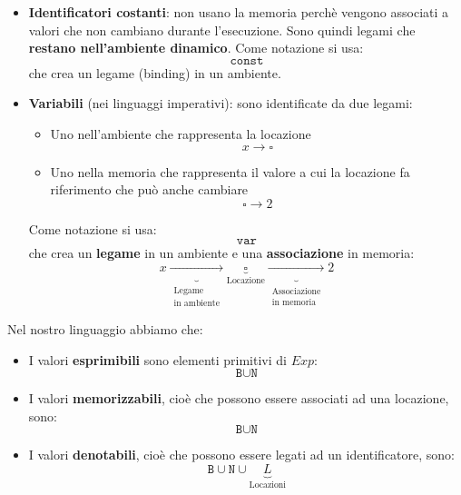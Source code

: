 \documentclass[a4paper]{article}
\begin{document}
\begin{itemize}
  \item \textbf{Identificatori costanti}: non usano la memoria perchè vengono associati
    a valori che non cambiano durante l'esecuzione. Sono quindi legami che
    \textbf{restano nell'ambiente dinamico}. Come notazione si usa:
    \[
      \texttt{const}
    \] 
    che crea un legame (binding) in un ambiente.

  \item \textbf{Variabili} (nei linguaggi imperativi): sono identificate da due legami:
    \begin{itemize}
      \item Uno nell'ambiente che rappresenta la locazione
        \[
          x \to \square
        \] 
      \item Uno nella memoria che rappresenta il valore a cui la locazione fa
        riferimento che può anche cambiare
        \[
          \square \to 2
        \] 
    \end{itemize}
    Come notazione si usa:
    \[
      \texttt{var}
    \] 
    che crea un \textbf{legame} in un ambiente e una \textbf{associazione} in memoria:
    \[
      x \underbrace{\longrightarrow}_{\substack{\text{Legame}\\\text{in ambiente}}}
      \underbrace{\square}_{\text{Locazione}}
      \underbrace{\longrightarrow}_{\substack{\text{Associazione}\\\text{in memoria}}}
      2
    \] 
\end{itemize}

\vspace{1em}
\noindent
Nel nostro linguaggio abbiamo che:
\begin{itemize}
  \item I valori \textbf{esprimibili} sono elementi primitivi di \( Exp \):
    \[
      \texttt{B} \cup \texttt{N}
    \] 

  \item I valori \textbf{memorizzabili}, cioè che possono essere associati ad una
    locazione, sono:
    \[
      \texttt{B} \cup \texttt{N}
    \] 

  \item I valori \textbf{denotabili}, cioè che possono essere legati ad un identificatore,
    sono:
    \[
      \texttt{B} \cup \texttt{N} \cup \underbrace{L}_{\text{Locazioni}}
    \] 
\end{itemize}
\end{document}
